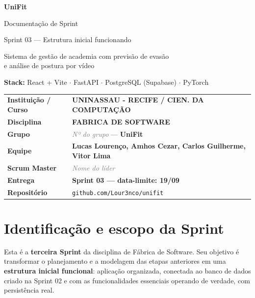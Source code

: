 \documentclass[11pt,a4paper,final]{article}
\newcommand{\cod}[1]{\texttt{#1}}
\newcommand{\preencher}[1]{\textit{\textcolor{gray}{#1}}}
\begin{document}
\begin{titlepage}
  \centering
  \vspace*{3cm}
  {\Huge\bfseries\color{azul} UniFit\par}
  \vspace{0.6cm}
  {\LARGE Documentação de Sprint\par}
  \vspace{0.3cm}
  {\Large Sprint 03 --- Estrutura inicial funcionando\par}
  \vspace{1.2cm}
  {\large Sistema de gestão de academia com previsão de evasão\\
  e análise de postura por vídeo\par}
  \vspace{0.8cm}
  {\small\textbf{Stack:} React + Vite $\cdot$ FastAPI $\cdot$ PostgreSQL (Supabase) $\cdot$ PyTorch\par}
  \vfill
  \begin{tabular}{>{\bfseries}l l}
    \toprule
    Instituição / Curso & \textbf{UNINASSAU - RECIFE / CIEN. DA COMPUTAÇÃO} \\
    Disciplina          & \textbf{FABRICA DE SOFTWARE} \\
    Grupo               & \preencher{Nº do grupo} --- \textbf{UniFit} \\
    Equipe              & \textbf{Lucas Lourenço, Amhos Cezar, Carlos Guilherme, Vitor Lima} \\
    Scrum Master        & \preencher{Nome do líder} \\
    Entrega             & \textbf{Sprint 03 --- data-limite: 19/09} \\
    Repositório         & \cod{github.com/Lour3nco/unifit} \\
    \bottomrule
  \end{tabular}
  \vspace{1.5cm}
\end{titlepage}

\tableofcontents
\newpage

\section{Identificação e escopo da Sprint}

Esta é a \textbf{terceira Sprint} da disciplina de Fábrica de Software. Seu objetivo é transformar o
planejamento e a modelagem das etapas anteriores em uma \textbf{estrutura inicial funcional}: aplicação
organizada, conectada ao banco de dados criado na Sprint 02 e com as funcionalidades essenciais
operando de verdade, com persistência real.
\end{document}
